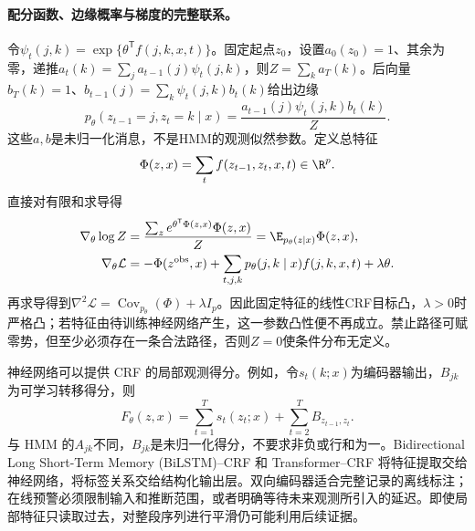\paragraph{配分函数、边缘概率与梯度的完整联系。}
令$\psi_t(j,k)=\exp\{\theta^{\mathsf T}f(j,k,x,t)\}$。固定起点$z_0$，设置$a_0(z_0)=1$、其余为零，递推$a_t(k)=\sum_ja_{t-1}(j)\psi_t(j,k)$，则$Z=\sum_ka_T(k)$。后向量$b_T(k)=1$、$b_{t-1}(j)=\sum_k\psi_t(j,k)b_t(k)$给出边缘
\begin{equation}
 p_\theta(z_{t-1}=j,z_t=k\mid x)
 =\frac{a_{t-1}(j)\psi_t(j,k)b_t(k)}{Z}.
\end{equation}
这些$a,b$是未归一化消息，不是HMM的观测似然参数。定义总特征
\begin{equation}
 \Phi(z,x)=\sum_tf(z_{t-1},z_t,x,t)\in\R^p.
\end{equation}
直接对有限和求导得
\begin{align}
 \nabla_\theta\log Z
 &=\frac{\sum_z e^{\theta^{\mathsf T}\Phi(z,x)}\Phi(z,x)}{Z}
 =\E_{p_\theta(z\mid x)}\Phi(z,x),\\
 \nabla_\theta\mathcal L
 &=-\Phi(z^{\rm obs},x)+\sum_{t,j,k}p_\theta(j,k\mid x)f(j,k,x,t)+\lambda\theta.
\end{align}
再求导得到$\nabla^2\mathcal L=\operatorname{Cov}_{p_\theta}(\Phi)+\lambda I_p$。因此固定特征的线性CRF目标凸，$\lambda>0$时严格凸；若特征由待训练神经网络产生，这一参数凸性便不再成立。禁止路径可赋零势，但至少必须存在一条合法路径，否则$Z=0$使条件分布无定义。

神经网络可以提供 CRF 的局部观测得分。例如，令$s_t(k;x)$为编码器输出，$B_{jk}$为可学习转移得分，则
\begin{equation}
 F_\theta(z,x)=\sum_{t=1}^{T}s_t(z_t;x)+\sum_{t=2}^{T}B_{z_{t-1},z_t}.
\end{equation}
与 HMM 的$A_{jk}$不同，$B_{jk}$是未归一化得分，不要求非负或行和为一。Bidirectional Long Short-Term Memory (BiLSTM)--CRF 和 Transformer--CRF 将特征提取交给神经网络，将标签关系交给结构化输出层。双向编码器适合完整记录的离线标注；在线预警必须限制输入和推断范围，或者明确等待未来观测所引入的延迟。即使局部特征只读取过去，对整段序列进行平滑仍可能利用后续证据。

